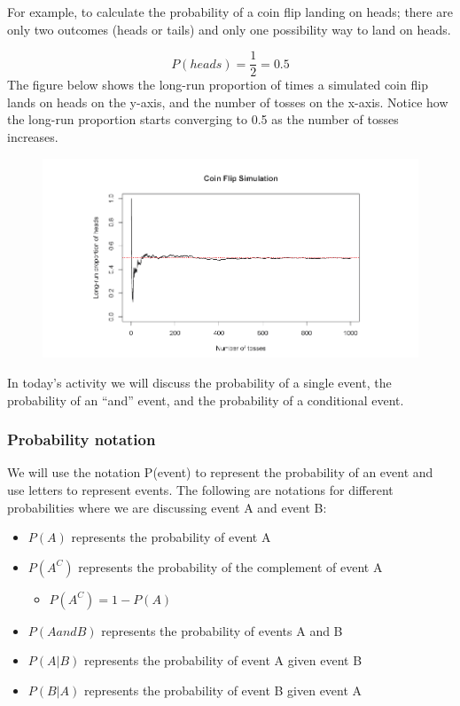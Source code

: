 \documentclass[
]{report}
\providecommand{\tightlist}{%
  \setlength{\itemsep}{0pt}\setlength{\parskip}{0pt}}
\begin{document}
For example, to calculate the probability of a coin flip landing on heads; there are only two outcomes (heads or tails) and only one possibility way to land on heads.

\[P(heads) = \frac{1}{2} = 0.5\]
The figure below shows the long-run proportion of times a simulated coin flip lands on heads on the y-axis, and the number of tosses on the x-axis. Notice how the long-run proportion starts converging to 0.5 as the number of tosses increases.

\begin{figure}

{\centering \includegraphics[width=0.65\linewidth]{images/coinsim} 

}

\end{figure}

In today's activity we will discuss the probability of a single event, the probability of an ``and'' event, and the probability of a conditional event.

\subsubsection*{Probability notation}\label{probability-notation}

We will use the notation P(event) to represent the probability of an event and use letters to represent events. The following are notations for different probabilities where we are discussing event A and event B:

\begin{itemize}
\item
  \(P(A)\) represents the probability of event A
\item
  \(P(A^C)\) represents the probability of the complement of event A

  \begin{itemize}
  \tightlist
  \item
    \(P(A^C) = 1 - P(A)\)
  \end{itemize}
\item
  \(P(A and B)\) represents the probability of events A and B
\item
  \(P(A|B)\) represents the probability of event A given event B
\item
  \(P(B|A)\) represents the probability of event B given event A
\end{itemize}
\end{document}
